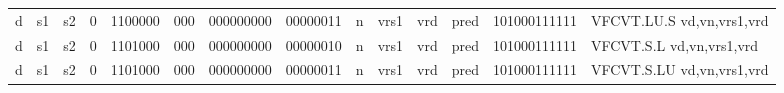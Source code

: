 \begin{landscape}
\begin{table}[p]
\begin{small}
\begin{center}
\begin{tabular}{p{0.08in}@{}p{0.08in}@{}p{0.08in}@{}p{0.08in}@{}p{0.50in}@{}p{0.30in}@{}p{0.08in}@{}p{0.8in}@{}p{0.48in}@{}p{0.32in}@{}p{0.08in}@{}p{0.8in}@{}p{0.8in}@{}p{0.4in}@{}p{0.56in}l}
\multicolumn{1}{|c|}{d} &
\multicolumn{1}{c|}{s1} &
\multicolumn{1}{c|}{s2} &
\multicolumn{1}{c|}{0} &
\multicolumn{1}{c|}{1100000} &
\multicolumn{1}{c|}{000} &
\multicolumn{2}{c|}{000000000} &
\multicolumn{2}{c|}{00000011} &
\multicolumn{1}{c|}{n} &
\multicolumn{1}{c|}{vrs1} &
\multicolumn{1}{c|}{vrd} &
\multicolumn{1}{c|}{pred} &
\multicolumn{1}{c|}{101000111111} & VFCVT.LU.S vd,vn,vrs1,vrd \\
\cline{1-15}
  

\multicolumn{1}{|c|}{d} &
\multicolumn{1}{c|}{s1} &
\multicolumn{1}{c|}{s2} &
\multicolumn{1}{c|}{0} &
\multicolumn{1}{c|}{1101000} &
\multicolumn{1}{c|}{000} &
\multicolumn{2}{c|}{000000000} &
\multicolumn{2}{c|}{00000010} &
\multicolumn{1}{c|}{n} &
\multicolumn{1}{c|}{vrs1} &
\multicolumn{1}{c|}{vrd} &
\multicolumn{1}{c|}{pred} &
\multicolumn{1}{c|}{101000111111} & VFCVT.S.L vd,vn,vrs1,vrd \\
\cline{1-15}
  

\multicolumn{1}{|c|}{d} &
\multicolumn{1}{c|}{s1} &
\multicolumn{1}{c|}{s2} &
\multicolumn{1}{c|}{0} &
\multicolumn{1}{c|}{1101000} &
\multicolumn{1}{c|}{000} &
\multicolumn{2}{c|}{000000000} &
\multicolumn{2}{c|}{00000011} &
\multicolumn{1}{c|}{n} &
\multicolumn{1}{c|}{vrs1} &
\multicolumn{1}{c|}{vrd} &
\multicolumn{1}{c|}{pred} &
\multicolumn{1}{c|}{101000111111} & VFCVT.S.LU vd,vn,vrs1,vrd \\
\cline{1-15}
  

\end{tabular}
\end{center}
\end{small}

\label{instr-table}
\end{table}
\end{landscape}
\restoregeometry
  

\newpage

